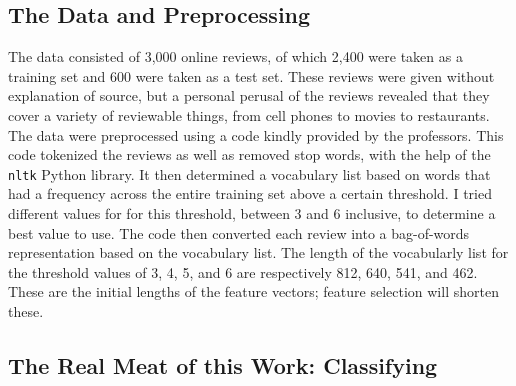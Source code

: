 \subsection{The Data and Preprocessing}
The data consisted of 3,000 online reviews, of which 2,400 were taken as a training set and 600 were taken as a test set.  These reviews were given without explanation of source, but a personal perusal of the reviews revealed that they cover a variety of reviewable things, from cell phones to movies to restaurants.  The data were preprocessed using a code kindly provided by the professors.  This code tokenized the reviews as well as removed stop words, with the help of the \texttt{nltk} Python library.  It then determined a vocabulary list based on words that had a frequency across the entire training set above a certain threshold.  I tried different values for for this threshold, between 3 and 6 inclusive, to determine a best value to use.  The code then converted each review into a bag-of-words representation based on the vocabulary list.  The length of the vocabularly list for the threshold values of 3, 4, 5, and 6 are respectively 812, 640, 541, and 462.  These are the initial lengths of the feature vectors; feature selection will shorten these.

\subsection{The Real Meat of this Work: Classifying}

